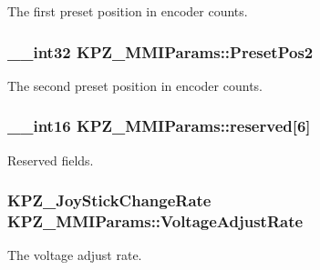 The first preset position in encoder counts. 

\subsubsection[{\texorpdfstring{Preset\+Pos2}{PresetPos2}}]{\setlength{\rightskip}{0pt plus 5cm}\+\_\+\+\_\+int32 K\+P\+Z\+\_\+\+M\+M\+I\+Params\+::\+Preset\+Pos2}\hypertarget{struct_k_p_z___m_m_i_params_a5279d530673e8ac878cc6e1f992d2636}{}\label{struct_k_p_z___m_m_i_params_a5279d530673e8ac878cc6e1f992d2636}


The second preset position in encoder counts. 

\subsubsection[{\texorpdfstring{reserved}{reserved}}]{\setlength{\rightskip}{0pt plus 5cm}\+\_\+\+\_\+int16 K\+P\+Z\+\_\+\+M\+M\+I\+Params\+::reserved\mbox{[}6\mbox{]}}\hypertarget{struct_k_p_z___m_m_i_params_acf9317bf4efb7dd1db4ec2468db9a6d4}{}\label{struct_k_p_z___m_m_i_params_acf9317bf4efb7dd1db4ec2468db9a6d4}


Reserved fields. 

\subsubsection[{\texorpdfstring{Voltage\+Adjust\+Rate}{VoltageAdjustRate}}]{\setlength{\rightskip}{0pt plus 5cm}K\+P\+Z\+\_\+\+Joy\+Stick\+Change\+Rate K\+P\+Z\+\_\+\+M\+M\+I\+Params\+::\+Voltage\+Adjust\+Rate}\hypertarget{struct_k_p_z___m_m_i_params_ad71328a3ce42e7fbba846710e3c213b1}{}\label{struct_k_p_z___m_m_i_params_ad71328a3ce42e7fbba846710e3c213b1}


The voltage adjust rate. 

